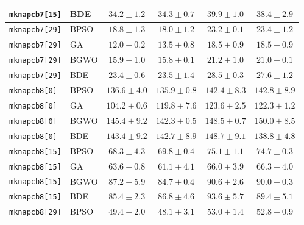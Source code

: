 \documentclass[journal,article,submit,moreauthors]{Definitions/mdpi}
\begin{document}
\begin{longtable}{llcccc}
    \texttt{mknapcb7[15]} & BDE   &  $\mathbf{34.2 \pm 1.2}$ &           $34.3 \pm 0.7$ &           $39.9 \pm 1.0$ &           $38.4 \pm 2.9$ \\
    \midrule
    \texttt{mknapcb7[29]} & BPSO  &           $18.8 \pm 1.3$ &  $\mathbf{18.0 \pm 1.2}$ &           $23.2 \pm 0.1$ &           $23.4 \pm 1.2$ \\
    \texttt{mknapcb7[29]} & GA    &  $\mathbf{12.0 \pm 0.2}$ &           $13.5 \pm 0.8$ &           $18.5 \pm 0.9$ &           $18.5 \pm 0.9$ \\
    \texttt{mknapcb7[29]} & BGWO  &           $15.9 \pm 1.0$ &  $\mathbf{15.8 \pm 0.1}$ &           $21.2 \pm 1.0$ &           $21.0 \pm 0.1$ \\
    \texttt{mknapcb7[29]} & BDE   &  $\mathbf{23.4 \pm 0.6}$ &           $23.5 \pm 1.4$ &           $28.5 \pm 0.3$ &           $27.6 \pm 1.2$ \\
    \midrule
    \texttt{mknapcb8[0]} & BPSO  &          $136.6 \pm 4.0$ & $\mathbf{135.9 \pm 0.8}$ &          $142.4 \pm 8.3$ &          $142.8 \pm 8.9$ \\
    \texttt{mknapcb8[0]} & GA    & $\mathbf{104.2 \pm 0.6}$ &          $119.8 \pm 7.6$ &          $123.6 \pm 2.5$ &          $122.3 \pm 1.2$ \\
    \texttt{mknapcb8[0]} & BGWO  &          $145.4 \pm 9.2$ & $\mathbf{142.3 \pm 0.5}$ &          $148.5 \pm 0.7$ &          $150.0 \pm 8.5$ \\
    \texttt{mknapcb8[0]} & BDE   &          $143.4 \pm 9.2$ &          $142.7 \pm 8.9$ &          $148.7 \pm 9.1$ & $\mathbf{138.8 \pm 4.8}$ \\
    \midrule
    \texttt{mknapcb8[15]} & BPSO  &  $\mathbf{68.3 \pm 4.3}$ &           $69.8 \pm 0.4$ &           $75.1 \pm 1.1$ &           $74.7 \pm 0.3$ \\
    \texttt{mknapcb8[15]} & GA    &           $63.6 \pm 0.8$ &  $\mathbf{61.1 \pm 4.1}$ &           $66.0 \pm 3.9$ &           $66.3 \pm 4.0$ \\
    \texttt{mknapcb8[15]} & BGWO  &           $87.2 \pm 5.9$ &  $\mathbf{84.7 \pm 0.4}$ &           $90.6 \pm 2.6$ &           $90.0 \pm 0.3$ \\
    \texttt{mknapcb8[15]} & BDE   &  $\mathbf{85.4 \pm 2.3}$ &           $86.8 \pm 4.6$ &           $93.6 \pm 5.7$ &           $89.4 \pm 5.1$ \\
    \midrule
    \texttt{mknapcb8[29]} & BPSO  &           $49.4 \pm 2.0$ &  $\mathbf{48.1 \pm 3.1}$ &           $53.0 \pm 1.4$ &           $52.8 \pm 0.9$ \\

\end{longtable}
\end{document}
